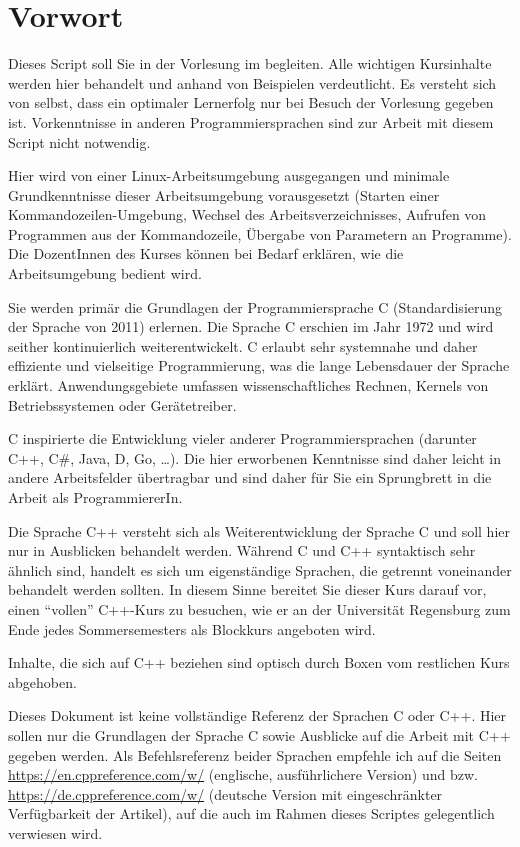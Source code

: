 \section*{Vorwort}
Dieses Script soll Sie in der Vorlesung \emph{\myTitle} im \currentPeriod begleiten. Alle wichtigen Kursinhalte werden hier behandelt und anhand von Beispielen verdeutlicht. Es versteht sich von selbst, dass ein optimaler Lernerfolg nur bei Besuch der Vorlesung gegeben ist. Vorkenntnisse in anderen Programmiersprachen sind zur Arbeit mit diesem Script nicht notwendig. 

Hier wird von einer Linux-Arbeits\-umgebung ausgegangen und minimale Grundkenntnisse dieser Arbeits\-umgebung vorausgesetzt (Starten einer Kommandozeilen-Umgebung, Wechsel des Arbeitsverzeichnisses, Aufrufen von Programmen aus der Kommandozeile, Übergabe von Parametern an Programme). Die DozentInnen des Kurses können bei Bedarf erklären, wie die Arbeitsumgebung bedient wird.

Sie werden primär die Grundlagen der Programmiersprache C (Standardisierung der Sprache von 2011) erlernen. Die Sprache C erschien im Jahr 1972 und wird seither kontinuierlich weiterentwickelt. C erlaubt sehr systemnahe und daher effiziente und vielseitige Programmierung, was die lange Lebensdauer der Sprache erklärt. Anwendungsgebiete umfassen \ua wissenschaftliches Rechnen, Kernels von Betriebssystemen oder Gerätetreiber.

C inspirierte die Entwicklung vieler anderer Programmiersprachen (darunter C++, C\#, Java, D, Go, \ldots). Die hier erworbenen Kenntnisse sind daher leicht in andere Arbeitsfelder übertragbar und sind daher für Sie ein Sprungbrett in die Arbeit als ProgrammiererIn.

Die Sprache C++ versteht sich als Weiterentwicklung der Sprache C und soll hier nur in Ausblicken behandelt werden. Während C und C++ syntaktisch sehr ähnlich sind, handelt es sich um eigenständige Sprachen, die getrennt voneinander behandelt werden sollten. In diesem Sinne bereitet Sie dieser Kurs darauf vor, einen \enquote{vollen} C++-Kurs zu besuchen, wie er an der Universität Regensburg zum Ende jedes Sommersemesters als Blockkurs angeboten wird.

\begin{plusbox}
Inhalte, die sich auf C++ beziehen sind optisch durch Boxen vom restlichen Kurs abgehoben.
\end{plusbox}

Dieses Dokument ist keine vollständige Referenz der Sprachen C oder C++. Hier sollen nur die Grundlagen der Sprache C sowie Ausblicke auf die Arbeit mit C++ gegeben werden. Als Befehlsreferenz beider Sprachen empfehle ich auf die Seiten \url{https://en.cppreference.com/w/} (englische, ausführlichere Version) und bzw. \url{https://de.cppreference.com/w/} (deutsche Version mit eingeschränkter Verfügbarkeit der Artikel), auf die auch im Rahmen dieses Scriptes gelegentlich verwiesen wird.

